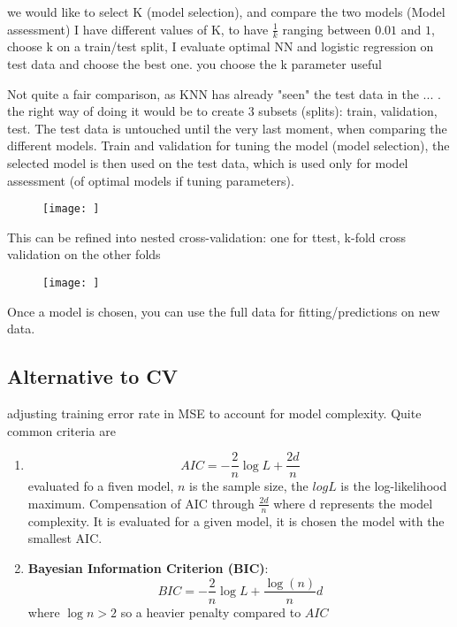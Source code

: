 we would like to select K (model selection), and compare the two models (Model assessment)
I have different values of K, to have $\frac{1}{k}$ ranging between $0.01$ and $1$, choose k on a train/test split, I evaluate optimal NN and logistic regression on test data and choose the best one. you choose the k parameter useful

Not quite a fair comparison, as KNN has already "seen" the test data in the ... . the right way of doing it would be to create $3$ subsets (splits): train, validation, test. The test data is untouched until the very last moment, when comparing the different models. Train and validation for tuning the model (model selection), the selected model is then used on the test data, which is used only for model assessment (of optimal models if tuning parameters).

\begin{figure}[h]
\caption{}
\centering
\texttt{[image: ]}
\label{}
\end{figure}

This can be refined into nested cross-validation: one for ttest, k-fold cross validation on the other folds

\begin{figure}[h]
\caption{}
\centering
\texttt{[image: ]}
\label{}
\end{figure}

Once a model is chosen, you can use the full data for fitting/predictions on new data.


\subsection{Alternative to CV}
adjusting training error rate in MSE  to account for model complexity. Quite common criteria are 
\begin{enumerate}
	\item $$ AIC = -\frac{2}{n}\log{L} + \frac{2d}{n}$$ 
	evaluated fo a fiven model, $n$ is the sample size, the $logL$ is the log-likelihood maximum. Compensation of AIC through $\frac{2d}{n}$ where d represents the model complexity. It is evaluated for a given model, it is chosen the model with the smallest AIC.
	
	\item \textbf{Bayesian Information Criterion (BIC)}:
	$$ BIC = - \frac{2}{n}\log{L} + \frac{\log{(n)}}{n} d $$
	where $\log{n} > 2$ so a heavier penalty compared to $AIC$
\end{enumerate}
 